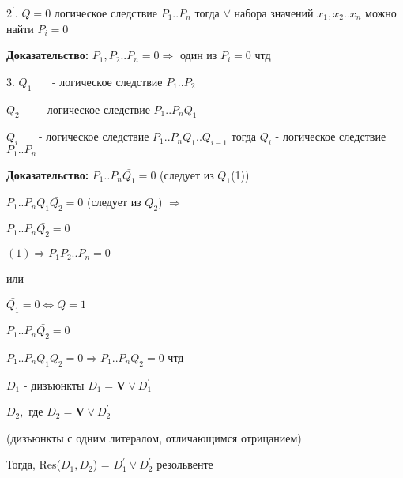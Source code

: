 \documentclass[russian]{lecture-notes}
\begin{document}
    $2^{'}.$ $Q=0$ логическое следствие $P_{1}..P_{n}$ тогда $\forall$ набора значений $x_{1},x_{2}..x_{n}$ можно найти $P_{i}=0$

    \textbf{Доказательство: } $P_{1},P_{2}..P_{n} = 0 \Rightarrow $ один из $P_{i} = 0$ чтд

    3. $Q_{1}$ ~~~- логическое следствие $P_{1}..P_{2}$

    $Q_{2}$ ~~~- логическое следствие $P_{1}..P_{n} Q_{1}$

    $Q_{i}$ ~~~- логическое следствие $P_{1}..P_{n} Q_{1}..Q_{i-1}$ тогда $Q_{i}$ - логическое следствие $P_{1}..P_{n}$

    \textbf{Доказательство: } $P_{1}..P_{n} \bar{Q_{1}} = 0$ (следует из $Q_{1}$(1))

    $P_{1}..P_{n} Q_{1}\bar{Q_{2}} = 0$ (следует из $Q_{2}$) $\Rightarrow$

    $P_{1}..P_{n} \bar{Q_{2}} = 0$

    $(1) \Rightarrow P_{1}P_{2}..P_{n} = 0 $

    или

    $\bar{Q_{1}} = 0 \Leftrightarrow Q = 1$

    $P_{1}..P_{n} \bar{Q_{2}} = 0$

    $P_{1}..P_{n} Q_{1}\bar{Q_{2}} = 0 \Rightarrow P_{1}..P_{n}Q_{2} = 0 $ чтд

    \begin{definition}
        $D_{1}$ - дизъюнкты $D_{1} = \mathbf{V} \lor D_{1}^{'}$

        $D_{2} ,$ где $D_{2} = \mathbf{V} \lor D_{2}^{'}$

        (дизъюнкты с одним литералом, отличающимся отрицанием)

        Тогда, Res($D_{1},D_{2}$) = $D_{1}^{'} \lor D_{2}^{'}$ резольвенте

    \end{definition}
\end{document}
